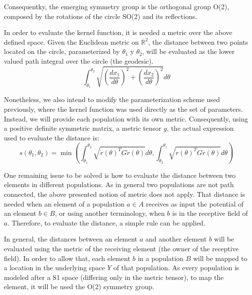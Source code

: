 Consequentky, the emerging symmetry group is the orthogonal group
O(2), composed by the rotations of the circle SO(2) and its
reflections.

In order to evaluate the kernel function, it is needed a metric over
the above defined space. Given the Euclidean metric on $\mathbb{R}^2$,
the distance between two points located on the circle, parameterized
by $\theta_1$ y $\theta_2$, will be evaluated as the lower valued path
integral over the circle (the geodesic).
\begin{equation}
  \int_{\theta_1}^{\theta_2}\sqrt{\left(\frac{dx_1}{d\theta}\right)^2
    + \left(\frac{dx_2}{d\theta}\right)^2}d\theta
\end{equation}

Nonetheless, we also intend to modify the parameterization scheme used
previously, where the kernel function was used directly as the set of
parameters. Instead, we will provide each population with its own
metric. Consequently, using a positive definite symmetric matrix, a
metric tensor $g$, the actual expression used to evaluate the distance
is:
\begin{equation}
  s(\theta_1,\theta_2)=\min\left(\int_{\theta_1}^{\theta_2}\sqrt{\dot{r}(\theta)^TG\dot{r}(\theta)}d\theta,\int_{\theta_2}^{\theta_1}\sqrt{\dot{r}(\theta)^TG\dot{r}(\theta)}d\theta\right)
\end{equation}

One remaining issue to be solved is how to evaluate the distance
between two elements in different populations. As in general two
populations are not path connected, the above presented notion of
metric does not apply. That distance is needed when an element of a
population $a \in A$ receives as input the potential of an element $b
\in B$, or using another terminology, when $b$ is in the receptive
field of $a$. Therefore, to evaluate the distance, a simple rule can
be applied.

In general, the distances between an element $a$ and another element
$b$ will be evaluated using the metric of the receiving element (the
owner of the receptive field). In order to allow that, each element
$b$ in a population $B$ will be mapped to a location in the underlying
space $Y$ of that population. As every population is modeled after a
S1 space (differing only in the metric tensor), to map the element, it
will be used the O(2) symmetry group.

